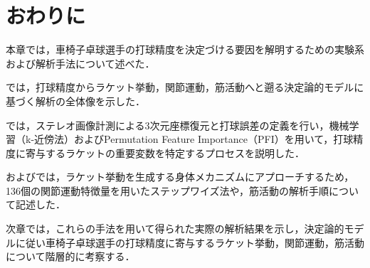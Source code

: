 \documentclass[../main]{subfiles}
\begin{document}
\clearpage



\section{おわりに}
\label{sec:pmethod_conclusion}

本章では，車椅子卓球選手の打球精度を決定づける要因を解明するための実験系および解析手法について述べた．

では，打球精度からラケット挙動，関節運動，筋活動へと遡る決定論的モデルに基づく解析の全体像を示した．

では，ステレオ画像計測による3次元座標復元と打球誤差の定義を行い，機械学習（k-近傍法）およびPermutation Feature Importance（PFI）を用いて，打球精度に寄与するラケットの重要変数を特定するプロセスを説明した．

およびでは，ラケット挙動を生成する身体メカニズムにアプローチするため，136個の関節運動特徴量を用いたステップワイズ法や，筋活動の解析手順について記述した．

次章では，これらの手法を用いて得られた実際の解析結果を示し，決定論的モデルに従い車椅子卓球選手の打球精度に寄与するラケット挙動，関節運動，筋活動について階層的に考察する．

\clearpage
\end{document}
